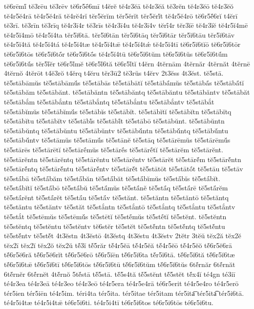 {tĕ6rēmĭ́
tĕ3rēu
tĕ3rēv
tĕ6r5ḗ6mī
t4ĕrĕ
tĕ4r3ĕā
tĕ4r3ĕă
tĕ3rĕn
tĕ4r3ĕō
tĕ4r3ĕŏ
tĕ4r5ĕ4rā
tĕ4r5ĕ4ră
tĕ4rĕ4rĭ
tĕr5ĕrĭm
tĕr5ĕrĭt
tĕr5ĕrĭ́t
tĕ4r5ĕ4rō
tĕ6r5ĕ́6rĭ
t4ĕrī
tĕ3rī.
tĕ3rīn
tĕ3rīq
tĕ4r3ī4r
tĕ3rīs
tĕ4r3ī4u
tĕ4r3ī4v
tĕrī́4r
tĕr3ĭē
tĕ4r3ĭĕ
tĕ4r5ĭ4mē
tĕ4r5ĭ4mō
tĕ4r5ĭ4ta
tĕr5ĭ6tā.
tĕr5ĭ6tān
tĕr5ĭ6tāq
tĕr5ĭ6tār
tĕr5ĭ6tāu
tĕr5ĭ6tāv
tĕ4r5ĭ4tă
tĕ4r5ĭ4tá
tĕ4r5ĭ4tæ
tĕ4r5ĭ4tǣ
tĕ4r5ĭ4tǽ
tĕ4r5ĭ4tī
tĕ6r5ĭ6tĭō
tĕ6r5ĭ6tōr
tĕ6r5ĭ6tōs
tĕ6r5ĭ6tṓr
tĕ6r5ĭ6tṓs
tĕ4r5ĭ4tū
tĕ6r5ĭ6tŭm
tĕ6r5ĭ6tŭs
tĕ6r5ĭ6tŭ́m
tĕ6r5ĭ6tŭ́s
tĕr5ĭ́ĕr
tĕ6r5ĭ́mĕ
tĕ6r5ĭ́6tă
tĕ6r5ĭ́tĭ
t4ĕrn
4tĕrnām
4tĕrnăr
4tĕrnăt
4tĕrnē
4tĕrnŏ
4tĕrōt
t4ĕ3rŏ
t4ĕrq
t4ĕru
tĕr3ū2
tĕ3rŭs
t4ĕrv
2t3ĕss
4t3ĕst.
tĕ5stā.
tĕ5stābāmŭs
tĕ5stābāmŭ́s
tĕ5stābās
tĕ5stābātĭ
tĕ5stābā́mŭs
tĕ5stābā́s
tĕ5stābā́tĭ
tĕ5stābăm
tĕ5stābănt.
tĕ5stābăntn
tĕ5stābăntq
tĕ5stābăntu
tĕ5stābăntv
tĕ5stābăt
tĕ5stābắm
tĕ5stābắntn
tĕ5stābắntq
tĕ5stābắntu
tĕ5stābắntv
tĕ5stābắt
tĕ5stābĭmŭs
tĕ5stābĭmŭ́s
tĕ5stābĭs
tĕ5stābĭt.
tĕ5stābĭtĭ
tĕ5stābĭtn
tĕ5stābĭtq
tĕ5stābĭtu
tĕ5stābĭtv
tĕ5stābĭ́s
tĕ5stābĭ́t
tĕ5stābō
tĕ5stābŭnt.
tĕ5stābŭntn
tĕ5stābŭntq
tĕ5stābŭntu
tĕ5stābŭntv
tĕ5stābŭ́ntn
tĕ5stābŭ́ntq
tĕ5stābŭ́ntu
tĕ5stābŭ́ntv
tĕ5stāmŭs
tĕ5stāmŭ́s
tĕ5stānĕ
tĕ5stāq
tĕ5stārēmŭs
tĕ5stārēmŭ́s
tĕ5stārēs
tĕ5stārētĭ
tĕ5stārḗmŭs
tĕ5stārḗs
tĕ5stārḗtĭ
tĕ5stārĕm
tĕ5stārĕnt.
tĕ5stārĕntn
tĕ5stārĕntq
tĕ5stārĕntu
tĕ5stārĕntv
tĕ5stārĕt
tĕ5stārĕ́m
tĕ5stārĕ́ntn
tĕ5stārĕ́ntq
tĕ5stārĕ́ntu
tĕ5stārĕ́ntv
tĕ5stārĕ́t
tĕ5stātōt
tĕ5stātṓt
tĕ5stāu
tĕ5stāv
tĕ5stā́bā
tĕ5stā́băm
tĕ5stā́băn
tĕ5stā́băt
tĕ5stā́bĭmŭs
tĕ5stā́bĭs
tĕ5stā́bĭt.
tĕ5stā́bĭtĭ
tĕ5stā́bō
tĕ5stā́bŭ
tĕ5stā́mŭs
tĕ5stā́nĕ
tĕ5stā́q
tĕ5stā́rē
tĕ5stā́rĕm
tĕ5stā́rĕnt
tĕ5stā́rĕt
tĕ5stā́u
tĕ5stā́v
tĕ5stănt.
tĕ5stăntn
tĕ5stăntō
tĕ5stăntq
tĕ5stăntu
tĕ5stăntv
tĕ5stăt
tĕ5stắntn
tĕ5stắntō
tĕ5stắntq
tĕ5stắntu
tĕ5stắntv
tĕ5stắt
tĕ5stēmŭs
tĕ5stēmŭ́s
tĕ5stētĭ
tĕ5stḗmŭs
tĕ5stḗtĭ
tĕ5stĕnt.
tĕ5stĕntn
tĕ5stĕntq
tĕ5stĕntu
tĕ5stĕntv
tĕ6stĕr
tĕ5stĕt
tĕ5stĕ́ntn
tĕ5stĕ́ntq
tĕ5stĕ́ntu
tĕ5stĕ́ntv
tĕ5stĕ́t
4t3ĕstn
4t3ĕstō
4t3ĕstq
4t3ĕstu
4t3ĕstv
2tĕtr
3tĕŭ
tĕx2ă
tĕx2ĕ
tĕx2ī
tĕx2ĭ
tĕx2ŏ
tĕx2ŭ
tĕ́3ĭ
tĕ́5răr
tĕ́4r5ĕā
tĕ́4r5ĕă
tĕ́4r5ĕō
tĕ́4r5ĕŏ
tĕ́6r5ĕ6rā
tĕ́6r5ĕ6ră
tĕ́6r5ĕ6rĭt
tĕ́6r5ĕ6rō
tĕ́6r5ĭēn
tĕ́6r5ĭ6ta
tĕ́r5ĭ6tā.
tĕ́6r5ĭ6tă
tĕ́6r5ĭ6tæ
tĕ́6r5ĭ6tǣ
tĕ́6r5ĭ6tī
tĕ́6r5ĭ6tōs
tĕ́6r5ĭ6tū
tĕ́6r5ĭ6tŭm
tĕ́6r5ĭ6tŭs
6tĕ́rnăr
6tĕ́rnăt
6tĕ́rnĕr
6tĕ́rnĕt
4tĕ́rnŏ
5tĕ́stā
tĕ́5stā.
tĕ́5s4tă
tĕ́5stĕnt
tĕ́5stĕt
tĕ́x4ĭ
té4gn
té3iī
té4r3ea
té4r3eā
té4r3eo
té4r3eō
té4r5era
té4r5e4rā
té6r5erit
té4r5e4ro
té4r5erō
tér5ien
tér5iēn
té4r5im.
téri4ta
tér5ita.
tér5itae
tér5itam
tér5ita͞
tér5ita͡
tér5i6tā.
té4r5i4tæ
té4r5i4tǣ
té6r5i6ti.
té4r5i4tī
té6r5i6tos
té6r5i6tōs
té6r5i6tu.
}
